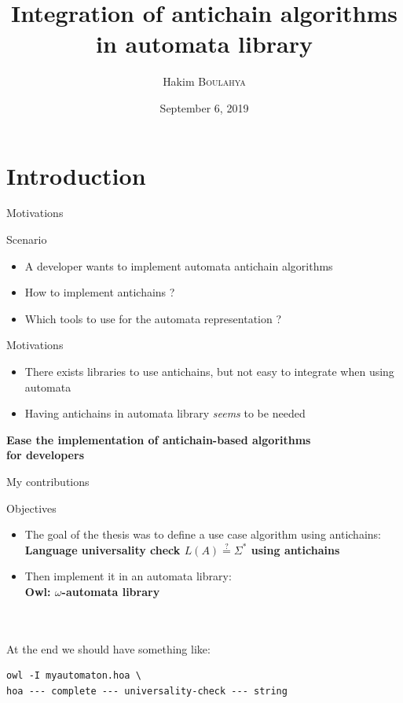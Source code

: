 \documentclass[10pt]{beamer}
\title{Integration of antichain algorithms \\ in automata library}  %
\date{September 6, 2019}
\author{
  Hakim \textsc{Boulahya}
}
\institute[
  Faculty of Science
  Université Libre de Bruxelles
  Belgium
] %
{%
    supervised by \\
    Emmanuel Filiot and
    Guillermo A. Pérez \\\


}
\begin{document}
{\aauwavesbg%
\begin{frame} %
  \titlepage
\end{frame}}

\section{Introduction}

\begin{frame}{Motivations}{}
    \begin{block}{Scenario}
      \begin{itemize}
        \item A developer wants to implement automata antichain algorithms
        \item How to implement antichains ?
        \item Which tools to use for the automata representation ?
      \end{itemize}
    \end{block}
    \begin{block}{Motivations}
        \begin{itemize}
            \item There exists libraries to use antichains, but not easy to integrate when using automata
            \item Having antichains in automata library \textit{seems} to be needed
        \end{itemize}
    \end{block}
    \begin{center}
        \textbf{Ease the implementation of antichain-based algorithms \\ for developers}
    \end{center}
\end{frame}

\begin{frame}[fragile]{My contributions}
  \begin{block}{Objectives}
      \begin{itemize}
          \item The goal of the thesis was to define a use case algorithm using antichains: \\ \textbf{Language universality check $L(A) \stackrel{?}{=} \Sigma^*$ using antichains}
          \item Then implement it in an automata library: \\ \textbf{Owl: $\omega$-automata library}
      \end{itemize}
\\~\\

At the end we should have something like:
      \begin{lstlisting}
owl -I myautomaton.hoa \
hoa --- complete --- universality-check --- string
      \end{lstlisting}
  \end{block}

\end{frame}
\end{document}
